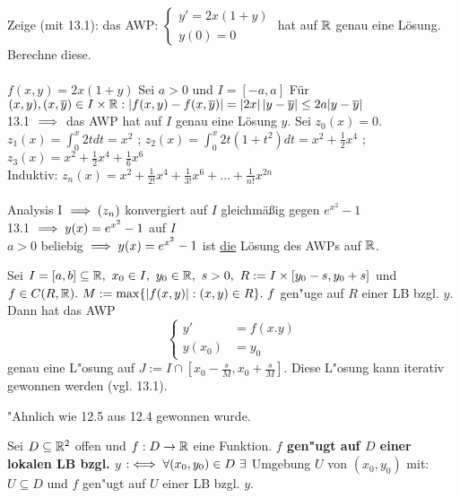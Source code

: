 \documentclass{article}
\begin{document}
\begin{beispiel}
$ $ \\Zeige (mit 13.1): das AWP: $\begin{cases} y' = 2x (1 + y) \\ y(0) = 0 \end{cases}$ hat auf $\mathbb{R}$ genau eine Lösung. Berechne diese. \\\\
$f(x,y) = 2x (1 + y)$ Sei $a > 0$ und $I = [-a , a]$ Für $(x , y) , (x , \overline{y}) \in I \times \mathbb{R}:\\
|f(x,y) - f(x,\overline{y})| = |2x| \, |y - \overline{y}| \leq 2a |y - \overline{y}|$ \\
13.1 $\implies$ das AWP hat auf $I$ genau eine Lösung $y$. Sei $z_0(x) = 0$. \\
$z_1(x) = \int_{0}^{x} 2t dt = x^2$ ; $z_2(x) = \int_0^x 2t (1 + t^2) dt = x^2 + \frac{1}{2}x^4$ ; \\ 
$z_3(x) = x^2 + \frac{1}{2}x^4 + \frac{1}{6}x^6$ \\
Induktiv: $z_n(x) = x^2 + \frac{1}{2!}x^4 + \frac{1}{3!}x^6 + \ldots + \frac{1}{n!}x^{2n}$ \\\\
Analysis I $\implies (z_n)$ konvergiert auf $I$ gleichmäßig gegen $e^{x^2} - 1$ \\
13.1 $\implies y(x) = e^{x^2} - 1$ auf $I$ \\
$a > 0$ beliebig $\implies y(x) = e^{x^2} - 1$ ist \underline{die} Lösung des AWPs auf $\mathbb{R}$.
\end{beispiel}

\begin{satz}
Sei $I=[a,b]\subseteq \mathbb{R},\ x_0\in I,\ y_0 \in \mathbb{R},\ s>0,\ R:=I\times[y_0-s,y_0+s]$ und $f\in C(R,\MdR).\ M:=\max\{|f(x,y)|:(x,y)\in R\}.\ f$ gen"uge auf $R$ einer LB bzgl. $y$. Dann hat das AWP
$$\begin{cases}
y'     & =f(x.y)\\
y(x_0) & =y_0
\end{cases}$$
genau eine L"osung auf $J:=I\cap [x_0-\frac{s}{M}, x_0+\frac{s}{M}].$ Diese L"osung kann iterativ gewonnen werden (vgl. 13.1).
\end{satz}

\begin{beweis}
"Ahnlich wie 12.5 aus 12.4 gewonnen wurde.
\end{beweis}

\begin{definition}
Sei $D\subseteq \mathbb{R}^2$ offen und $f:D\to\mathbb{R}$ eine Funktion. \textbf{$f$ gen"ugt auf $D$ einer lokalen LB bzgl. $y$} $:\equizu \forall (x_0,y_0)\in D\ \exists $ Umgebung $U$ von $(x_0,y_0)$ mit: $U\subseteq D$ und $f$ gen"ugt auf $U$ einer LB bzgl. $y$.
\end{definition}
\end{document}
